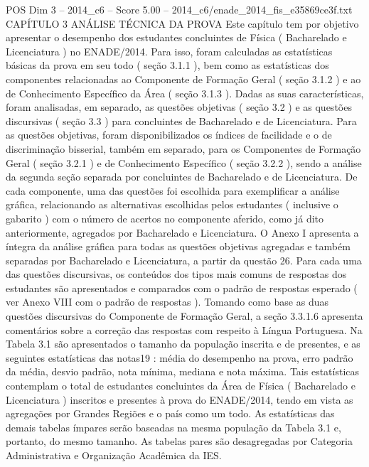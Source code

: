 \begin{textsample}{POS Dim 3 – 2014\_c6 – Score 5.00 – 2014\_c6/enade\_2014\_fis\_e35869ce3f.txt}  \label{ex:f3_pos_039}
CAPÍTULO 3 ANÁLISE TÉCNICA DA PROVA Este capítulo tem por objetivo apresentar o desempenho dos estudantes concluintes de Física ( Bacharelado e Licenciatura ) no ENADE/2014.
Para isso, foram calculadas as estatísticas básicas da prova em seu todo ( seção 3.1.1 ), bem como as estatísticas dos componentes relacionadas ao Componente de Formação Geral ( seção 3.1.2 ) e ao de Conhecimento Específico da Área ( seção 3.1.3 ).
Dadas as suas características, foram analisadas, em separado, as questões objetivas ( seção 3.2 ) e as questões discursivas ( seção 3.3 ) para concluintes de Bacharelado e de Licenciatura.
Para as questões objetivas, foram disponibilizados os índices de facilidade e o de discriminação bisserial, também em separado, para os Componentes de Formação Geral ( seção 3.2.1 ) e de Conhecimento Específico ( seção 3.2.2 ), sendo a análise da segunda seção separada por concluintes de Bacharelado e de Licenciatura.
De cada componente, uma das questões foi escolhida para exemplificar a análise gráfica, relacionando as alternativas escolhidas pelos estudantes ( inclusive o gabarito ) com o número de acertos no componente aferido, como já dito anteriormente, agregados por Bacharelado e Licenciatura.
O Anexo I apresenta a íntegra da análise gráfica para todas as questões objetivas agregadas e também separadas por Bacharelado e Licenciatura, a partir da questão 26.
Para cada uma das questões discursivas, os conteúdos dos tipos mais comuns de respostas dos estudantes são apresentados e comparados com o padrão de respostas esperado ( ver Anexo VIII com o padrão de respostas ).
Tomando como base as duas questões discursivas do Componente de Formação Geral, a seção 3.3.1.6 apresenta comentários sobre a correção das respostas com respeito à Língua Portuguesa.
Na Tabela 3.1 são apresentados o tamanho da população inscrita e de presentes, e as seguintes estatísticas das notas19 : média do desempenho na prova, erro padrão da média, desvio padrão, nota mínima, mediana e nota máxima.
Tais estatísticas contemplam o total de estudantes concluintes da Área de Física ( Bacharelado e Licenciatura ) inscritos e presentes à prova do ENADE/2014, tendo em vista as agregações por Grandes Regiões e o país como um todo.
As estatísticas das demais tabelas ímpares serão baseadas na mesma população da Tabela 3.1 e, portanto, do mesmo tamanho.
As tabelas pares são desagregadas por Categoria Administrativa e Organização Acadêmica da IES.

\end{textsample}

